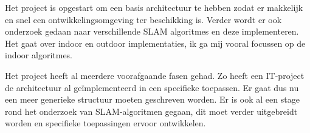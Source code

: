 Het project is opgestart om een basis architectuur te hebben zodat er makkelijk en snel een ontwikkelingsomgeving ter beschikking is. Verder wordt er ook onderzoek gedaan naar verschillende SLAM algoritmes en deze implementeren. Het gaat over indoor en outdoor implementaties, ik ga mij vooral focussen op de indoor algoritmes.

Het project heeft al meerdere voorafgaande fasen gehad. Zo heeft een IT-project de architectuur al geïmplementeerd in een specifieke toepassen. Er gaat dus nu een meer generieke structuur moeten geschreven worden. Er is ook al een stage rond het onderzoek van SLAM-algoritmen gegaan, dit moet verder uitgebreidt worden en specifieke toepassingen ervoor ontwikkelen.